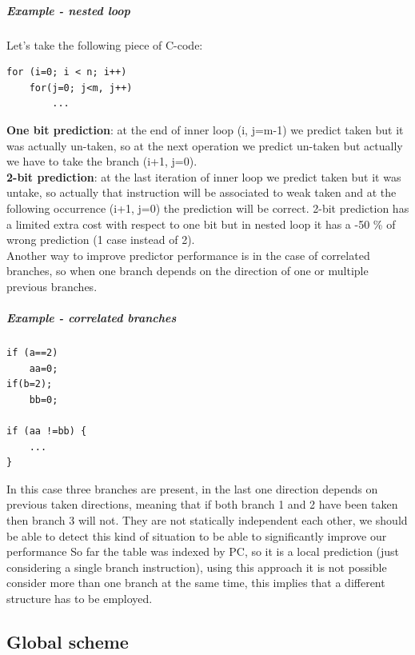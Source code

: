 \subparagraph{Example - nested loop}
Let's take the following piece of C-code:
\begin{verbatim}
for (i=0; i < n; i++)
    for(j=0; j<m, j++)
        ...
\end{verbatim}

\textbf{One bit prediction}: at the end of inner loop (i, j=m-1) we predict
taken but it was actually un-taken, so at the next operation we predict un-taken
but actually we have to take the branch (i+1, j=0).\\
\textbf{2-bit prediction}: at the last iteration of inner loop we predict taken
but it was untake, so actually that instruction will be associated to weak taken
and at the following occurrence (i+1, j=0) the prediction will be correct. 2-bit
prediction has a limited extra cost with respect to one bit but in nested loop
it has a -50 \% of wrong prediction (1 case instead of 2).\\

Another way to improve predictor performance is in the case of correlated
branches, so when one branch depends on the direction of one or multiple
previous branches.

\subparagraph{Example - correlated branches}
\begin{verbatim}
if (a==2)
    aa=0;
if(b=2);
    bb=0;

if (aa !=bb) {
    ...
}
\end{verbatim}

In this case three branches are present, in the last one direction depends on
previous taken directions, meaning that if both branch 1 and 2 have been taken
then branch 3 will not.
They are not statically independent each other, we should be able to detect this
kind of situation to be able to significantly improve our performance So far the
table was indexed by PC, so it is a local prediction (just considering a single
branch instruction), using this approach it is not possible consider more than
one branch at the same time, this implies that a different structure has to be
employed.


\subsection{Global scheme}

